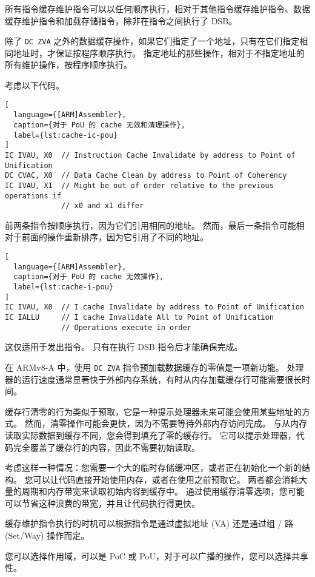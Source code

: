 所有指令缓存维护指令可以以任何顺序执行，相对于其他指令缓存维护指令、数据缓存维护指令和加载存储指令，除非在指令之间执行了 DSB。

除了 \lstinline!DC ZVA! 之外的数据缓存操作，如果它们指定了一个地址，只有在它们指定相同地址时，才保证按程序顺序执行。
指定地址的那些操作，相对于不指定地址的所有维护操作，按程序顺序执行。

考虑以下代码。

\begin{lstlisting}[
  language={[ARM]Assembler},
  caption={对于 PoU 的 cache 无效和清理操作},
  label={lst:cache-ic-pou}
]
IC IVAU, X0  // Instruction Cache Invalidate by address to Point of Unification
DC CVAC, X0  // Data Cache Clean by address to Point of Coherency
IC IVAU, X1  // Might be out of order relative to the previous operations if
             // x0 and x1 differ
\end{lstlisting}

前两条指令按顺序执行，因为它们引用相同的地址。
然而，最后一条指令可能相对于前面的操作重新排序，因为它引用了不同的地址。

\begin{lstlisting}[
  language={[ARM]Assembler},
  caption={对于 PoU 的 cache 无效操作},
  label={lst:cache-i-pou}
]
IC IVAU, X0  // I cache Invalidate by address to Point of Unification
IC IALLU     // I cache Invalidate All to Point of Unification
             // Operations execute in order
\end{lstlisting}

这仅适用于发出指令。
只有在执行 DSB 指令后才能确保完成。

在 ARMv8-A 中，使用 \lstinline!DC ZVA! 指令预加载数据缓存的零值是一项新功能。
处理器的运行速度通常显著快于外部内存系统，有时从内存加载缓存行可能需要很长时间。

缓存行清零的行为类似于预取，它是一种提示处理器未来可能会使用某些地址的方式。
然而，清零操作可能会更快，因为不需要等待外部内存访问完成。
与从内存读取实际数据到缓存不同，您会得到填充了零的缓存行。
它可以提示处理器，代码完全覆盖了缓存行的内容，因此不需要初始读取。

考虑这样一种情况：您需要一个大的临时存储缓冲区，或者正在初始化一个新的结构。
您可以让代码直接开始使用内存，或者在使用之前预取它。
两者都会消耗大量的周期和内存带宽来读取初始内容到缓存中。
通过使用缓存清零选项，您可能可以节省这种浪费的带宽，并且让代码执行得更快。

缓存维护指令执行的时机可以根据指令是通过虚拟地址 (VA) 还是通过组 / 路 (Set/Way) 操作而定。

您可以选择作用域，可以是 PoC 或 PoU，对于可以广播的操作，您可以选择共享性。

